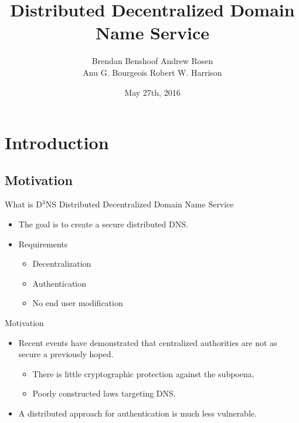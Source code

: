 \documentclass[11pt]{beamer}
\title[D$^3$NS]{Distributed Decentralized Domain Name Service}
\author{
Brendan Benshoof \qquad Andrew Rosen \\ \qquad Anu G. Bourgeois \qquad Robert W. Harrison }
\institute{Georgia State University}
\date{May 27th, 2016}
\begin{document}
	
\maketitle

\section{Introduction}
\subsection{Motivation}

\begin{frame}{What is D$^3$NS}
Distributed Decentralized Domain Name Service

\begin{itemize}
	\item The goal is to create a secure distributed DNS. 
	\item Requirements 
	\begin{itemize}
		\item Decentralization
		\item Authentication
		\item No end user modification
	\end{itemize}
\end{itemize}

\end{frame}



\begin{frame}{Motivation}
	\begin{itemize}
		\item  Recent events have demonstrated that centralized authorities are not as secure a previously hoped.
		\begin{itemize}
			\item There is little cryptographic protection against the subpoena.
			\item Poorly constructed laws targeting DNS.
		\end{itemize}	
		\item  A distributed approach for authentication is much less vulnerable.
	
	\end{itemize}
\end{frame}
\end{document}
